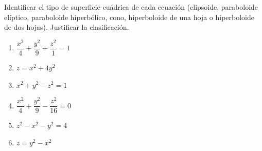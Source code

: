 Identificar el tipo de superficie cuádrica de cada ecuación (elipsoide, paraboloide elíptico, paraboloide hiperbólico, cono, hiperboloide de una hoja o hiperboloide de dos hojas). Justificar la clasificación.
\begin{enumerate}
    \item $\dfrac{x^2}{4} + \dfrac{y^2}{9} + \dfrac{z^2}{1} = 1$
    \item $z = x^2 + 4y^2$
    \item $x^2 + y^2 - z^2 = 1$
    \item $\dfrac{x^2}{4} + \dfrac{y^2}{9} - \dfrac{z^2}{16} = 0$
    \item $z^2 - x^2 - y^2 = 4$
    \item $z = y^2 - x^2$
\end{enumerate}